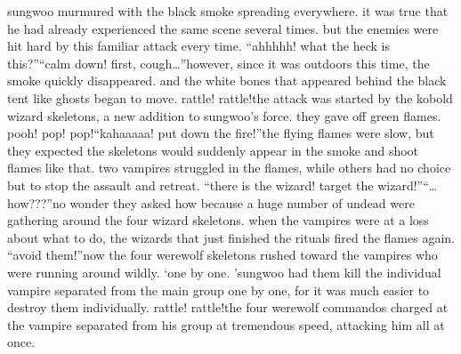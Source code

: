 sungwoo murmured with the black smoke spreading everywhere.
 it was true that he had already experienced the same scene several times.
 but the enemies were hit hard by this familiar attack every time.
“ahhhhh! what the heck is this?”“calm down! first, cough…”however, since it was outdoors this time, the smoke quickly disappeared.
 and the white bones that appeared behind the black tent like ghosts began to move.
rattle! rattle!the attack was started by the kobold wizard skeletons, a new addition to sungwoo’s force.
they gave off green flames.
pooh! pop! pop!“kahaaaaa! put down the fire!”the flying flames were slow, but they expected the skeletons would suddenly appear in the smoke and shoot flames like that.
two vampires struggled in the flames, while others had no choice but to stop the assault and retreat.
“there is the wizard! target the wizard!”“…how???”no wonder they asked how because a huge number of undead were gathering around the four wizard skeletons.
 when the vampires were at a loss about what to do, the wizards that just finished the rituals fired the flames again.
“avoid them!”now the four werewolf skeletons rushed toward the vampires who were running around wildly.
‘one by one.
’sungwoo had them kill the individual vampire separated from the main group one by one, for it was much easier to destroy them individually.
rattle! rattle!the four werewolf commandos charged at the vampire separated from his group at tremendous speed, attacking him all at once.


 